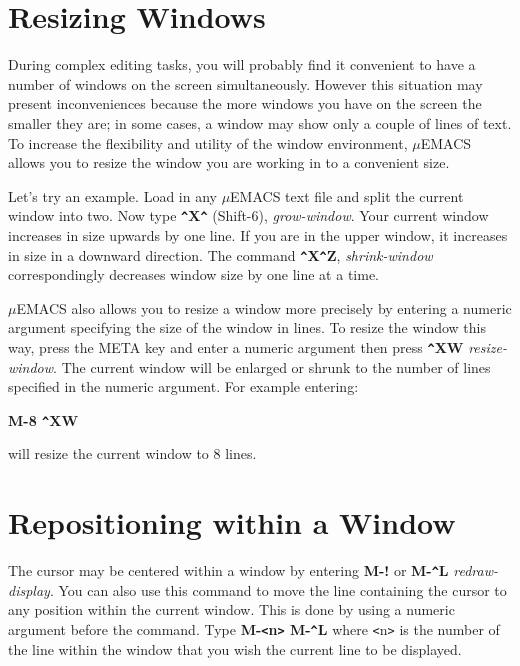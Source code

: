\section{Resizing Windows}

During complex editing tasks, you will probably find it convenient to
have a number of windows on the screen simultaneously. However this
situation may present inconveniences because the more windows you have
on the screen the smaller they are; in some cases, a window may show
only a couple of lines of text. To increase the flexibility and utility
of the window environment, $\mu$EMACS allows you to resize the window you
are working in to a convenient size.

Let's try an example. Load in any $\mu$EMACS text file and split the
current window into two. Now type {\bf \verb+^+X\verb+^+} (Shift-6),
{\it grow-window}. Your current window  increases in size upwards by
one line. If you are in the upper window, it increases in size in a
downward direction. The command {\bf \verb+^+X\verb+^+Z}, {\it
shrink-window} correspondingly decreases window size by one line at a
time.

$\mu$EMACS also allows you to resize a window more precisely by
entering a numeric argument specifying the size of the window in lines.
To resize the window this way, press the META key and enter a numeric
argument then press {\bf \verb+^+XW} {\it resize-window}. The current
window will be enlarged or shrunk to the number of lines specified in
the numeric argument. For example entering:

{\bf M-8 \verb+^+XW}

will resize the current window to 8 lines.

\section{Repositioning within a Window}

The cursor may be centered within a window by entering {\bf M-!} or
{\bf M-\verb+^+L} {\it redraw-display}. You can also use this command
to move the line containing the cursor to any position within the
current window. This is done by using a numeric argument before the
command. Type {\bf M-\verb+<+n\verb+>+ M-\verb+^+L} where
\verb+<+n\verb+>+ is the number of the line within the window that you
wish the current line to be displayed.


